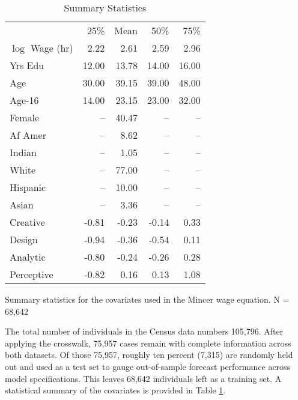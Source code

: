 \documentclass[12pt]{article}
\theoremstyle{definition}
\begin{document}
\begin{table}[t!] \centering
  \caption{Summary Statistics}
  \begin{threeparttable}
    \begin{tabular}[l]{l r r r r}
  \cmidrule{1-5}

                   & 25\%   & Mean & 50\% & 75\%    \\
  \cmidrule{1-5}
  $\log$ Wage (hr) &  2.22 &  2.61 &  2.59  &  2.96 \\
  Yrs Edu          & 12.00 & 13.78 & 14.00  & 16.00 \\
  Age              & 30.00 & 39.15 & 39.00  & 48.00 \\
  Age-16           & 14.00 & 23.15 & 23.00  & 32.00 \\
  Female           & --    & 40.47 & --     & --    \\
  Af Amer          & --    &  8.62 & --     & --    \\
  Indian           & --    &  1.05 & --     & --    \\
  White            & --    & 77.00 & --     & --    \\
  Hispanic         & --    & 10.00 & --     & --    \\
  Asian            & --    &  3.36 & --     & --    \\
  Creative         & -0.81 & -0.23 & -0.14  &  0.33 \\
  Design           & -0.94 & -0.36 & -0.54  &  0.11 \\
  Analytic         & -0.80 & -0.24 & -0.26  &  0.28 \\
  Perceptive       & -0.82 &  0.16 &  0.13  &  1.08 \\

  \hline
    \end{tabular}
    \begin{tablenotes}
      \item{\footnotesize Summary statistics for the covariates used in the Mincer wage equation. N = 68,642}
    \end{tablenotes} \label{tbl:census_cov_summary}
  \end{threeparttable}
\end{table}

The total number of individuals in the Census data numbers 105,796.
After applying the crosswalk, 75,957 cases remain with complete
information across both datasets. Of those 75,957, roughly ten percent
(7,315) are randomly held out and used as a test set to gauge
out-of-sample forecast performance across model specifications.
This leaves 68,642 individuals left as a training set. A statistical summary
of the covariates is provided in Table \ref{tbl:census_cov_summary}.
\end{document}
